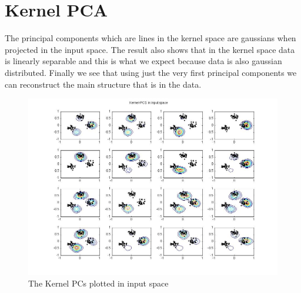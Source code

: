\documentclass[]{article}
\begin{document}

\clearpage

\section{Kernel PCA} %
\label{sg:sec:kernel_pca}

The principal components which are lines in the kernel space are gaussians when projected in the input space.
The result also shows that in the kernel space data is linearly separable and this is what we expect because data is also gaussian distributed.
Finally we see that using just the very first principal components we can reconstruct the main structure that is in the data.

\begin{figure}[h]
	\centering
		\includegraphics[width=\textwidth]{kernel_pcs.jpg}
	\caption{The Kernel PCs plotted in input space}
	\label{sg:fig:kernel_pcs}
\end{figure}


\end{document}
